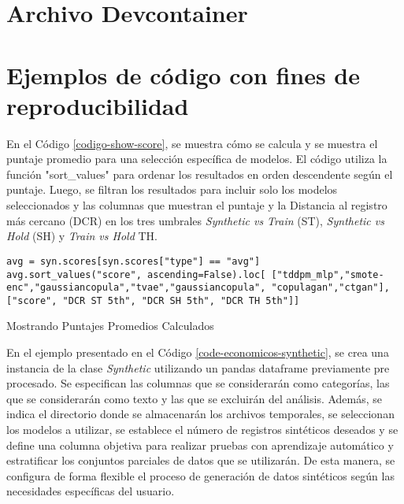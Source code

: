 
\section{Archivo Devcontainer}
\label{devcontainer-anexo}

\section{Ejemplos de código con fines de reproducibilidad}
\label{anexo:reproducibilidad}

En el Código \ref{codigo-show-score}, se muestra cómo se calcula y se muestra el puntaje promedio para una selección específica de modelos. El código utiliza la función "sort\_values" para ordenar los resultados en orden descendente según el puntaje. Luego, se filtran los resultados para incluir solo los modelos seleccionados y las columnas que muestran el puntaje y la Distancia al registro más cercano (DCR) en los tres umbrales \emph{Synthetic vs Train} (ST), \emph{Synthetic vs Hold} (SH) y \emph{Train vs Hold} TH.
\begin{listing}[H]
    \begin{verbatim}
avg = syn.scores[syn.scores["type"] == "avg"]
avg.sort_values("score", ascending=False).loc[ ["tddpm_mlp","smote-enc","gaussiancopula","tvae","gaussiancopula", "copulagan","ctgan"], ["score", "DCR ST 5th", "DCR SH 5th", "DCR TH 5th"]]
    \end{verbatim}
\caption{Mostrando Puntajes Promedios Calculados}
\label{codigo-show-score}
\end{listing}

En el ejemplo presentado en el Código \ref{code-economicos-synthetic}, se crea una instancia de la clase \emph{Synthetic} utilizando un pandas dataframe previamente pre procesado. Se especifican las columnas que se considerarán como categorías, las que se considerarán como texto y las que se excluirán del análisis. Además, se indica el directorio donde se almacenarán los archivos temporales, se seleccionan los modelos a utilizar, se establece el número de registros sintéticos deseados y se define una columna objetiva para realizar pruebas con aprendizaje automático y estratificar los conjuntos parciales de datos que se utilizarán. De esta manera, se configura de forma flexible el proceso de generación de datos sintéticos según las necesidades específicas del usuario.


